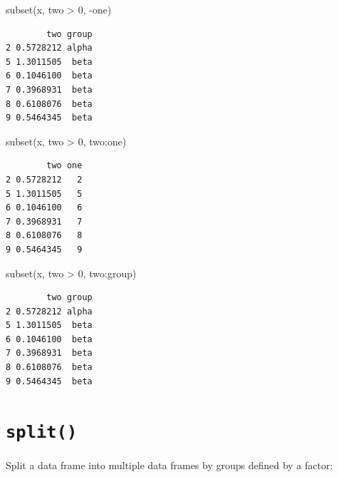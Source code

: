 \documentclass[
]{book}
\newenvironment{Shaded}{\begin{snugshade}}{\end{snugshade}}
\newcommand{\DecValTok}[1]{\textcolor[rgb]{0.00,0.00,0.81}{#1}}
\newcommand{\FunctionTok}[1]{\textcolor[rgb]{0.00,0.00,0.00}{#1}}
\newcommand{\NormalTok}[1]{#1}
\newcommand{\OtherTok}[1]{\textcolor[rgb]{0.56,0.35,0.01}{#1}}
\newcommand{\SpecialCharTok}[1]{\textcolor[rgb]{0.00,0.00,0.00}{#1}}
\begin{document}
\begin{Shaded}
\begin{Highlighting}[]
\FunctionTok{subset}\NormalTok{(x, two }\SpecialCharTok{\textgreater{}} \DecValTok{0}\NormalTok{, }\SpecialCharTok{{-}}\NormalTok{one)}
\end{Highlighting}
\end{Shaded}

\begin{verbatim}
        two group
2 0.5728212 alpha
5 1.3011505  beta
6 0.1046100  beta
7 0.3968931  beta
8 0.6108076  beta
9 0.5464345  beta
\end{verbatim}

\begin{Shaded}
\begin{Highlighting}[]
\FunctionTok{subset}\NormalTok{(x, two }\SpecialCharTok{\textgreater{}} \DecValTok{0}\NormalTok{, two}\SpecialCharTok{:}\NormalTok{one)}
\end{Highlighting}
\end{Shaded}

\begin{verbatim}
        two one
2 0.5728212   2
5 1.3011505   5
6 0.1046100   6
7 0.3968931   7
8 0.6108076   8
9 0.5464345   9
\end{verbatim}

\begin{Shaded}
\begin{Highlighting}[]
\FunctionTok{subset}\NormalTok{(x, two }\SpecialCharTok{\textgreater{}} \DecValTok{0}\NormalTok{, two}\SpecialCharTok{:}\NormalTok{group)}
\end{Highlighting}
\end{Shaded}

\begin{verbatim}
        two group
2 0.5728212 alpha
5 1.3011505  beta
6 0.1046100  beta
7 0.3968931  beta
8 0.6108076  beta
9 0.5464345  beta
\end{verbatim}

\hypertarget{split}{%
\section{\texorpdfstring{\texttt{split()}}{split()}}\label{split}}

Split a data frame into multiple data frames by groups defined by a factor:

\begin{Shaded}
\end{Shaded}
\end{document}
